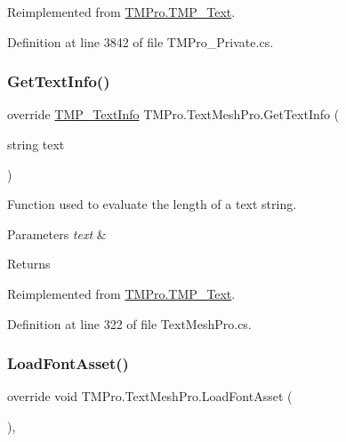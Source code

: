 Reimplemented from \mbox{\hyperlink{class_t_m_pro_1_1_t_m_p___text_aad195b1745c7631eaed1376b554a64b9}{T\+M\+Pro.\+T\+M\+P\+\_\+\+Text}}.



Definition at line 3842 of file T\+M\+Pro\+\_\+\+Private.\+cs.

\mbox{\label{class_t_m_pro_1_1_text_mesh_pro_a3652c1b48e8b425fc8a599aa05fad59e}} 
\subsubsection{\texorpdfstring{GetTextInfo()}{GetTextInfo()}}
{\footnotesize\ttfamily override \mbox{\hyperlink{class_t_m_pro_1_1_t_m_p___text_info}{T\+M\+P\+\_\+\+Text\+Info}} T\+M\+Pro.\+Text\+Mesh\+Pro.\+Get\+Text\+Info (\begin{DoxyParamCaption}\item[{string}]{text }\end{DoxyParamCaption})\hspace{0.3cm}{\ttfamily [virtual]}}



Function used to evaluate the length of a text string. 


\begin{DoxyParams}{Parameters}
{\em text} & \\
\hline
\end{DoxyParams}
\begin{DoxyReturn}{Returns}

\end{DoxyReturn}


Reimplemented from \mbox{\hyperlink{class_t_m_pro_1_1_t_m_p___text_a6818c7aebeca52a9e5205ec1225481c6}{T\+M\+Pro.\+T\+M\+P\+\_\+\+Text}}.



Definition at line 322 of file Text\+Mesh\+Pro.\+cs.

\mbox{\label{class_t_m_pro_1_1_text_mesh_pro_a5bb3ac2d25483c61b10064917225ca59}} 
\subsubsection{\texorpdfstring{LoadFontAsset()}{LoadFontAsset()}}
{\footnotesize\ttfamily override void T\+M\+Pro.\+Text\+Mesh\+Pro.\+Load\+Font\+Asset (\begin{DoxyParamCaption}{ }\end{DoxyParamCaption})\hspace{0.3cm}{\ttfamily [protected]}, {\ttfamily [virtual]}}




